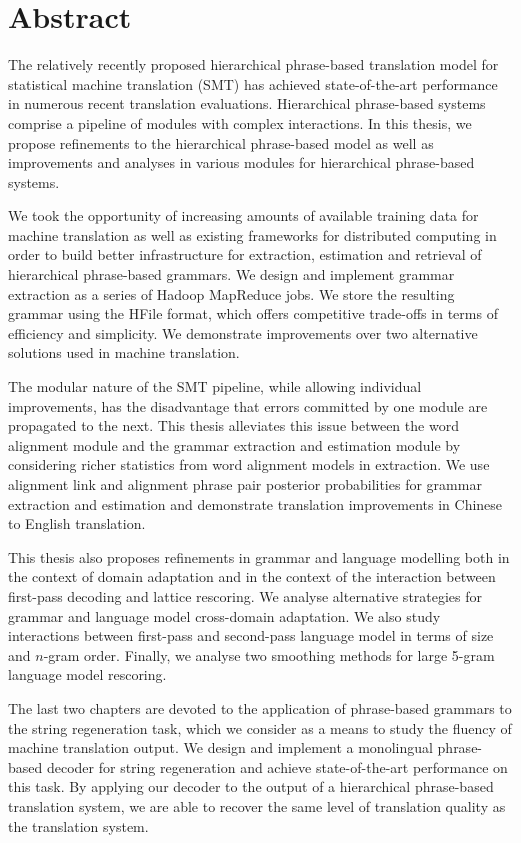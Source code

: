 \chapter*{Abstract}


The relatively recently proposed hierarchical phrase-based
translation model for statistical machine translation (SMT)
has achieved state-of-the-art performance
in numerous recent translation evaluations. Hierarchical phrase-based
systems comprise a pipeline of modules with complex interactions.
In this thesis, we propose refinements to the hierarchical
phrase-based model as well as improvements and analyses in various
modules for hierarchical phrase-based systems.

We took the opportunity of increasing amounts of available training
data for machine translation as well as existing frameworks for
distributed computing in order to build better infrastructure
for extraction, estimation and retrieval of hierarchical phrase-based
grammars. We design and implement grammar extraction as a series of
Hadoop MapReduce jobs. We store the resulting grammar using the HFile
format, which
offers competitive trade-offs in terms of efficiency and simplicity.
We demonstrate improvements over two alternative solutions used in
machine translation.

The modular nature of the SMT pipeline, while allowing individual
improvements, has the disadvantage that errors committed by
one module are propagated to the next. This thesis
alleviates this issue between the word alignment module and the
grammar extraction and estimation module by considering richer
statistics from word alignment models in extraction. We use
alignment link and alignment phrase pair posterior probabilities
for grammar extraction and estimation and demonstrate translation
improvements in Chinese to English translation.

This thesis also proposes refinements in grammar and language
modelling both in the context of domain adaptation and in the
context of the interaction between first-pass decoding and
lattice rescoring. We analyse alternative strategies for grammar
and language model cross-domain adaptation. We also
study interactions between first-pass and second-pass language
model in terms of size and $n$-gram order. Finally, we
analyse two smoothing methods for large 5-gram language model
rescoring.

The last two chapters are devoted to the application of
phrase-based grammars to the string regeneration task, which
we consider as a means to study
the fluency of machine translation output.
We design and implement a monolingual phrase-based decoder
for string regeneration and achieve state-of-the-art
performance on this task. By applying our decoder
to the output of a hierarchical phrase-based translation system, we
are able to recover the same level of translation quality as
the translation system.
